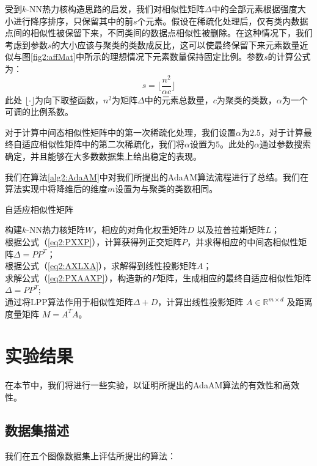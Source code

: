 受到$k$-NN热力核构造思路的启发，我们对相似性矩阵$\Delta$中的全部元素根据强度大小进行降序排序，只保留其中的前$s$个元素。假设在稀疏化处理后，仅有类内数据点间的相似性被保留下来，不同类间的数据点相似性被删除。在这种情况下，我们考虑到参数$s$的大小应该与聚类的类数成反比，这可以使最终保留下来元素数量近似与图\ref{fig2:affMat}中所示的理想情况下元素数量保持固定比例。参数$s$的计算公式为：
\begin{equation}
	s = \lfloor \frac{n^2}{\alpha c}\rfloor
\end{equation}
此处 $\lfloor \cdot\rfloor$为向下取整函数，$n^2$为矩阵$\Delta$中的元素总数量，$c$为聚类的类数，$\alpha$为一个可调的比例系数。

对于计算中间态相似性矩阵中的第一次稀疏化处理，我们设置$\alpha$为$2.5$，对于计算最终自适应相似性矩阵中的第二次稀疏化，我们将$\alpha$设置为$5$。此处的$\alpha$通过参数搜索确定，并且能够在大多数数据集上给出稳定的表现。

我们在算法\ref{alg2:AdaAM}中对我们所提出的AdaAM算法流程进行了总结。我们在算法实现中将降维后的维度$m$设置为与聚类的类数相同。


\begin{algorithm}[!htbp]
	\caption{自适应相似性矩阵}
	\label{alg2:AdaAM}
	构建$k$-NN热力核矩阵$W$，相应的对角化权重矩阵$D$ 以及拉普拉斯矩阵$L$；\\
	根据公式（\ref{eq2:PXXP}），计算获得列正交矩阵$P$，并求得相应的中间态相似性矩阵$\Delta = PP^T$；\\
	根据公式（\ref{eq2:AXLXA}），求解得到线性投影矩阵$A$；\\
	求解公式（\ref{eq2:PXAAXP}），构造新的$P$矩阵，生成相应的最终自适应相似性矩阵$\Delta = PP^T$;\\
	通过将LPP算法作用于相似性矩阵$\Delta + D$，计算出线性投影矩阵 $A\in\mathbb{R}^{m\times d}$ 及距离度量矩阵 $M=A^TA$。
\end{algorithm}

\section{实验结果}
\label{sec2:Exp}
在本节中，我们将进行一些实验，以证明所提出的AdaAM算法的有效性和高效性。
\subsection{数据集描述}
我们在五个图像数据集上评估所提出的算法：


